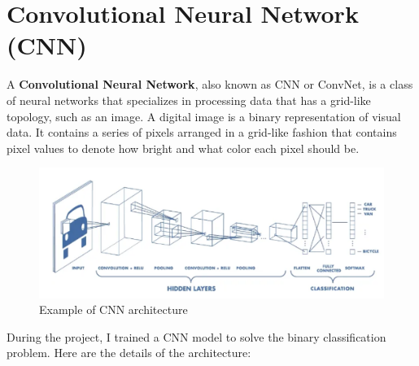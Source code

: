 \section{Convolutional Neural Network (CNN)}
A \textbf{Convolutional Neural Network}, also known as CNN or ConvNet, is a class of neural networks that specializes in processing data that has a grid-like topology, such as an image. A digital image is a binary representation of visual data. It contains a series of pixels arranged in a grid-like fashion that contains pixel values to denote how bright and what color each pixel should be. \cite{cnn}
\begin{figure}[hbtp]
\caption{Example of CNN architecture}
\centering
\includegraphics[scale=0.5]{../Images/cnnarch.png}
\end{figure}
During the project, I trained a CNN model to solve the binary classification problem. Here are the details of the architecture:
